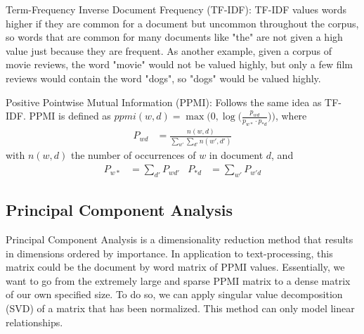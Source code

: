 Term-Frequency Inverse Document Frequency (TF-IDF): TF-IDF values words higher if they  are common for a document but uncommon throughout the corpus, so words that are common for many documents like "the" are not given a high value just because they are frequent. As another  example, given a corpus of movie reviews, the word "movie" would not be valued highly, but only a few film reviews would contain the word "dogs", so "dogs" would be valued highly. 

Positive Pointwise Mutual Information (PPMI): Follows the same idea as TF-IDF. 	PPMI is defined  as $\textit{ppmi}(w,d) = \max \big(0, \log\big(\frac{p_{wd}}{p_{w*} \cdotp p_{*d}}\big)\big)$, where
\begin{align*}
P_{wd} &= \frac{n(w, d)}{\sum_{w'} \sum_{d'} n(w', d')}
\end{align*}
with $n(w,d)$ the number of occurrences of $w$ in document $d$, and
\begin{align*}
P_{w*} &= \sum_{d'} P_{wd'} &
P_{*d} &= \sum_{w'} P_{w'd}
\end{align*}

\subsection{Principal Component Analysis}

Principal Component Analysis is a dimensionality reduction method that results in dimensions ordered by importance. In application to text-processing, this matrix could be the document by word matrix of PPMI values. Essentially, we want to go from the extremely large and sparse PPMI matrix to a dense matrix of our own specified size. To do so, we can apply singular value decomposition (SVD) of a matrix that has been normalized. This method can only model linear relationships.



